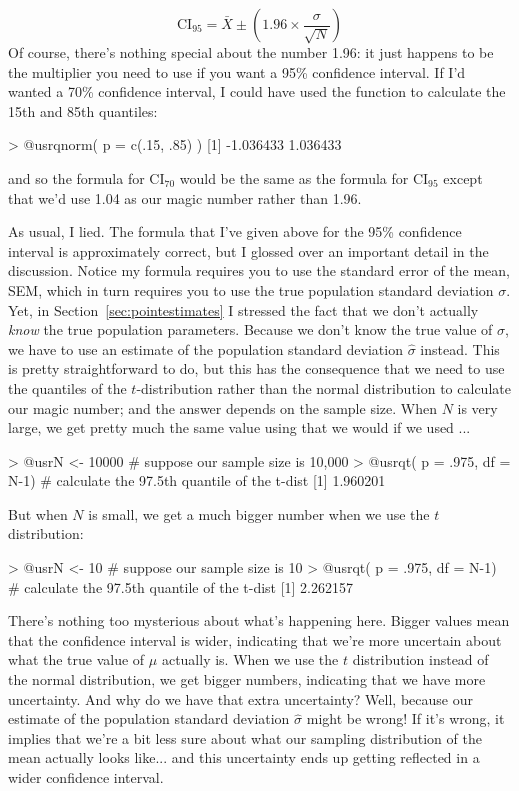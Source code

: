 $$
\mbox{CI}_{95} = \bar{X} \pm \left( 1.96 \times \frac{\sigma}{\sqrt{N}} \right)
$$
Of course, there's nothing special about the number 1.96: it just happens to be the multiplier you need to use if you want a 95\% confidence interval. If I'd wanted a 70\% confidence interval, I could have used the  function to calculate the 15th and 85th quantiles:
\begin{rblock1}
> @usr{qnorm( p = c(.15, .85) )}
[1] -1.036433  1.036433
\end{rblock1}
and so the formula for $\mbox{CI}_{70}$ would be the same as the formula for $\mbox{CI}_{95}$ except that we'd use 1.04 as our magic number rather than 1.96.


As usual, I lied. The formula that I've given above for the 95\% confidence interval is approximately correct, but I glossed over an important detail in the discussion. Notice my formula requires you to use the standard error of the mean, SEM, which in turn requires you to use the true population standard deviation $\sigma$. Yet, in Section~\ref{sec:pointestimates} I stressed the fact that we don't actually {\it know} the true population parameters. Because we don't know the true value of $\sigma$, we have to use an estimate of the population standard deviation $\hat{\sigma}$ instead. This is pretty straightforward to do, but this has the consequence that we need to use the quantiles of the $t$-distribution rather than the normal distribution to calculate our magic number; and the answer depends on the sample size. When $N$ is very large, we get pretty much the same value using  that we would if we used ...
\begin{rblock1}
> @usr{N <- 10000}   # suppose our sample size is 10,000
> @usr{qt( p = .975, df = N-1)}   # calculate the 97.5th quantile of the t-dist
[1] 1.960201
\end{rblock1}
But when $N$ is small, we get a much bigger number when we use the $t$ distribution:
\begin{rblock1}
> @usr{N <- 10}   # suppose our sample size is 10
> @usr{qt( p = .975, df = N-1)}   # calculate the 97.5th quantile of the t-dist
[1] 2.262157
\end{rblock1}
There's nothing too mysterious about what's happening here. Bigger values mean that the confidence interval is wider, indicating that we're more uncertain about what the true value of $\mu$ actually is. When we use the $t$ distribution instead of the normal distribution, we get bigger numbers, indicating that we have more uncertainty. And why do we have that extra uncertainty? Well, because our estimate of the population standard deviation $\hat\sigma$ might be wrong! If it's wrong, it implies that we're a bit less sure about what our sampling distribution of the mean actually looks like... and this uncertainty ends up getting reflected in a wider confidence interval.  


